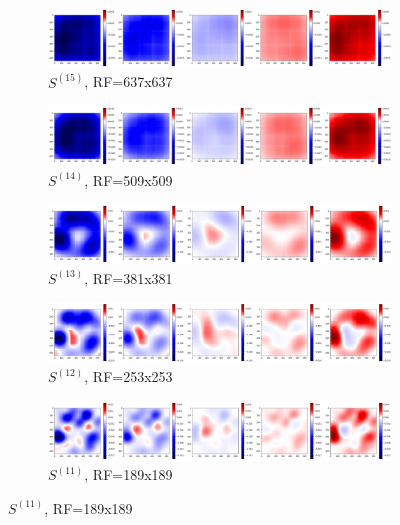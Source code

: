 \documentclass[preprint]{elsarticle}
\theoremstyle{definition} %
\theoremstyle{remark}
\begin{document}
\begin{figure}[h!]
	\centering
	\begin{subfigure}[b]{\textwidth}
		\includegraphics[width=\textwidth]{figures/score-prop-23713_left/score_rf637.png}
		\caption{$S^{(15)}$, RF=637x637}
		\label{fig:score_rf637}
	\end{subfigure}
	
	\begin{subfigure}[b]{\textwidth}
		\includegraphics[width=\textwidth]{figures/score-prop-23713_left/score_rf509.png}
		\caption{$S^{(14)}$, RF=509x509}
		\label{fig:score_rf509}
	\end{subfigure}
	
	\begin{subfigure}[b]{\textwidth}
		\includegraphics[width=\textwidth]{figures/score-prop-23713_left/score_rf381.png}
		\caption{$S^{(13)}$, RF=381x381}
		\label{fig:score_rf381}
	\end{subfigure}
	
	\begin{subfigure}[b]{\textwidth}
		\includegraphics[width=\textwidth]{figures/score-prop-23713_left/score_rf253.png}
		\caption{$S^{(12)}$, RF=253x253}
		\label{fig:score_rf253}
	\end{subfigure}
	
	\begin{subfigure}[b]{\textwidth}
		\includegraphics[width=\textwidth]{figures/score-prop-23713_left/score_rf189.png}
		\caption{$S^{(11)}$, RF=189x189}
		\label{fig:score_rf189}
	\end{subfigure}
	

\end{figure}
\end{document}
